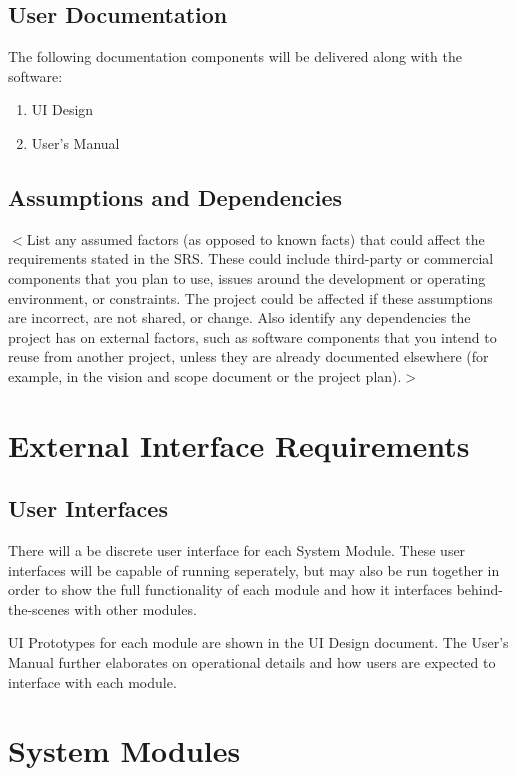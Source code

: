 \documentclass{scrreprt}
\begin{document}
\section{User Documentation}

The following documentation components will be delivered along with the software:
\begin{enumerate}
    \item UI Design
    \item User's Manual
\end{enumerate}

\section{Assumptions and Dependencies}

$<$List any assumed factors (as opposed to known facts) that could affect the 
requirements stated in the SRS. These could include third-party or commercial 
components that you plan to use, issues around the development or operating 
environment, or constraints. The project could be affected if these assumptions 
are incorrect, are not shared, or change. Also identify any dependencies the 
project has on external factors, such as software components that you intend to 
reuse from another project, unless they are already documented elsewhere (for 
example, in the vision and scope document or the project plan).$>$


\chapter{External Interface Requirements}

\section{User Interfaces}
There will a be discrete user interface for each System Module. These user
interfaces will be capable of running seperately, but may also be run together
in order to show the full functionality of each module and how it interfaces
behind-the-scenes with other modules.

UI Prototypes for each module are shown in the UI Design document. The User's
Manual further elaborates on operational details and how users are expected to
interface with each module.

\chapter{System Modules}
\end{document}
